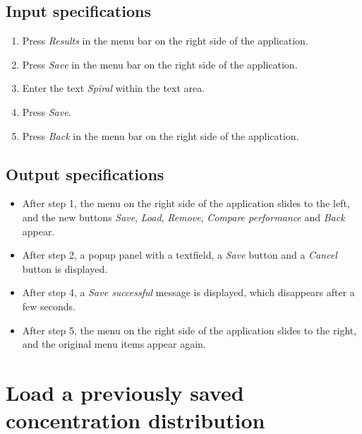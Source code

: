 \subsection*{Input specifications}
\begin{enumerate}
\item Press \emph{Results} in the menu bar on the right side of the application.
\item Press \emph{Save} in the menu bar on the right side of the application.
\item Enter the text \emph{Spiral} within the text area.
\item Press \emph{Save}.
\item Press \emph{Back} in the menu bar on the right side of the application.
\end{enumerate}

\subsection*{Output specifications}
\begin{itemize}
\item After step 1, the menu on the right side of the application slides to the left, and the new buttons \emph{Save}, \emph{Load}, \emph{Remove}, \emph{Compare performance} and \emph{Back} appear.
\item After step 2, a popup panel with a textfield, a \emph{Save} button and a \emph{Cancel} button is displayed.
\item After step 4, a \emph{Save successful} message is displayed, which disappears after a few seconds.
\item After step 5, the menu on the right side of the application slides to the right, and the original menu items appear again.
\end{itemize}

\section{Load a previously saved concentration distribution}

